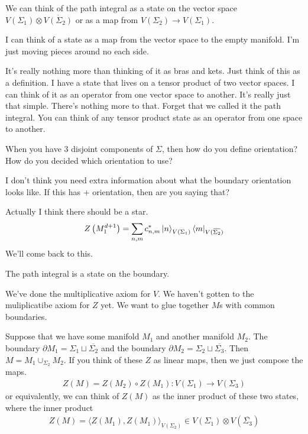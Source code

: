 We can think of the path integral as a state on the vector space
$V(\Sigma_1)\otimes\overbar{V(\Sigma_2)}$
or as a map from
$V(\Sigma_2)\to V(\Sigma_1)$.

I can think of a state as a map from the vector space to the empty manifold.
I'm just moving pieces around no each side.

It's really nothing more than thinking of it as bras and kets.
Just think of this as a definition.
I have a state that lives on a tensor product of two vector spaces.
I can think of it as an operator from one vector space to another.
It's really just that simple.
There's nothing more to that.
Forget that we called it the path integral.
You can think of any tensor product state as an operator from one space to
another.

\begin{question}
    When you have 3 disjoint components of $\Sigma$,
    then how do you define orientation?
    How do you decided which orientation to use?
\end{question}
I don't think you need extra information about what the boundary orientation
looks like.
If this has + orientation, then are you saying that?

Actually I think there should be a star.
\begin{align}
    Z\left( M_1^{d+1} \right)
    = \sum_{n,m} c_{n,m}^*
    \ket{n}_{V(\Sigma_1)}
    \bra{m}_{V(\overbar{\Sigma_2})}
\end{align}
We'll come back to this.

The path integral is a state on the boundary.

We've done the multiplicative axiom for $V$.
We haven't gotten to the muliplicatibe axiom for $Z$ yet.
We want to glue together $M$s with common boundaries.

Suppose that we have some manifold $M_1$
and another manifold $M_2$.
The boundary $\partial M_1 = \Sigma_1 \sqcup \overbar{\Sigma_2}$
and the boundary
$\partial M_2 = \Sigma_2 \sqcup \overbar{\Sigma_3}$.
Then $M=M_1 \cup_{\Sigma_2} M_2$.
If you think of these $Z$ as linear maps,
then we just compose the maps.
\begin{align}
    Z(M) = Z(M_2)\circ Z(M_1): V(\Sigma_1) \to V(\Sigma_3)
\end{align}
or equivalently,
we can think of $Z(M)$ as the inner product of these two states,
where the inner product
\begin{align}
    Z(M) =
    {\langle Z(M_1), Z(M_1) \rangle}_{V(\Sigma_2)}
    \in V(\Sigma_1) \otimes V(\overbar{\Sigma_3})
\end{align}

